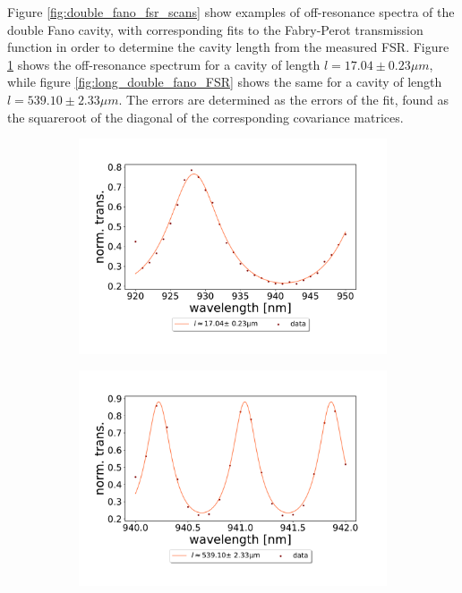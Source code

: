 Figure \ref{fig:double_fano_fsr_scans} show examples of off-resonance spectra of the double Fano cavity, with corresponding fits to the Fabry-Perot transmission function in order to determine the cavity length from the measured FSR. Figure \ref{fig:short_double_fano_FSR} shows the off-resonance spectrum for a cavity of length $l = 17.04 \pm 0.23 \mu m$, while figure \ref{fig:long_double_fano_FSR} shows the same for a cavity of length $l = 539.10 \pm 2.33 \mu m$. The errors are determined as the errors of the fit, found as the squareroot of the diagonal of the corresponding covariance matrices. 

\begin{figure}[h!]
    \centering
    \begin{subfigure}[b]{0.49\textwidth}
        \centering
        \includegraphics[width=\textwidth]{figures/results/double fano fits/30um_M3:M5_FSR_scan.pdf}
        \caption{}
        \label{fig:short_double_fano_FSR}
    \end{subfigure}
    \begin{subfigure}[b]{0.49\textwidth}
        \centering
        \includegraphics[width=\textwidth]{figures/results/double fano fits/550um_M3:M5_FSR_scan.pdf}

\end{subfigure}
\end{figure}
